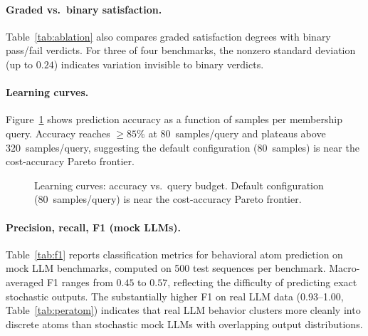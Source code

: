 \documentclass[11pt]{article}
\begin{document}
\paragraph{Graded vs.\ binary satisfaction.}
Table~\ref{tab:ablation} also compares graded satisfaction degrees
with binary pass/fail verdicts.  For three of four benchmarks, the nonzero
standard deviation (up to $0.24$) indicates variation invisible
to binary verdicts.

\paragraph{Learning curves.}
Figure~\ref{fig:learning-curves} shows prediction accuracy as a
function of samples per membership query.  Accuracy reaches ${\ge}85\%$
at 80~samples/query and plateaus above 320~samples/query, suggesting
the default configuration (80~samples) is near the cost-accuracy
Pareto frontier.

\begin{figure}[t]
\centering
{}
\caption{Learning curves: accuracy vs.\ query budget.  Default
  configuration (80~samples/query) is near the cost-accuracy
  Pareto frontier.}
\label{fig:learning-curves}
\end{figure}

\paragraph{Precision, recall, F1 (mock LLMs).}
Table~\ref{tab:f1} reports classification metrics for behavioral
atom prediction on mock LLM benchmarks, computed on 500 test
sequences per benchmark.  Macro-averaged F1 ranges from $0.45$ to
$0.57$, reflecting the difficulty of predicting exact stochastic
outputs.  The substantially higher F1 on real LLM data (0.93--1.00,
Table~\ref{tab:peratom}) indicates that real LLM behavior clusters
more cleanly into discrete atoms than stochastic mock LLMs with
overlapping output distributions.
\end{document}
